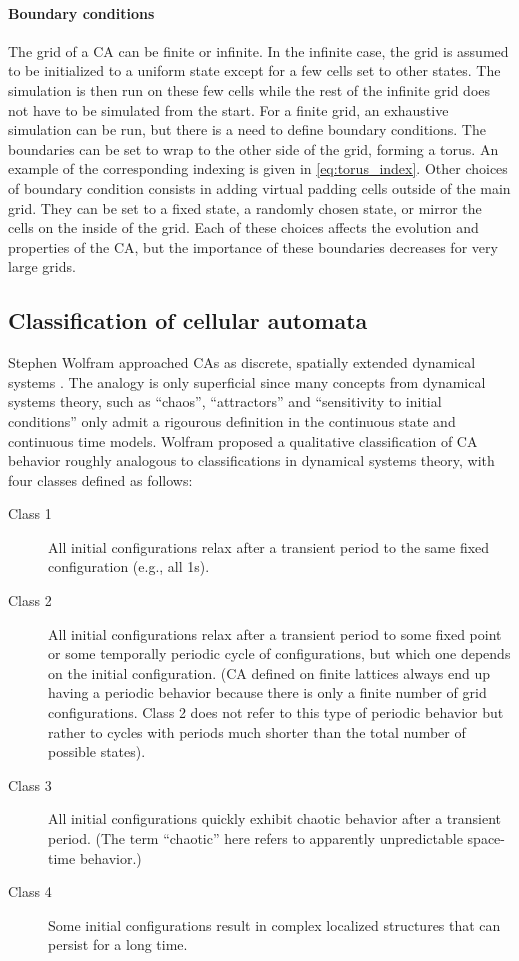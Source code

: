 \paragraph{Boundary conditions}
The grid of a \ac{CA} can be finite or infinite. In the infinite case, the grid
is assumed to be initialized to a uniform state except for a few cells set to
other states. The simulation is then run on these few cells while the rest of
the infinite grid does not have to be simulated from the start. For a finite
grid, an exhaustive simulation can be run, but there is a need to define
boundary conditions. The boundaries can be set to wrap to the other side of the
grid, forming a torus. An example of the corresponding indexing is given in
\eqref{eq:torus_index}. Other choices of boundary condition consists in adding
virtual padding cells outside of the main grid. They can be set to a fixed
state, a randomly chosen state, or mirror the cells on the inside of the grid.
Each of these choices affects the evolution and properties of the \ac{CA}, but
the importance of these boundaries decreases for very large grids.

\subsection{Classification of cellular automata\label{sec:class-cell-autom}}

Stephen Wolfram approached \acp{CA} as discrete, spatially extended dynamical
systems \parencite{wolframUniversalityComplexityCellular1984}. The analogy is
only superficial since many concepts from dynamical systems theory, such as
``chaos'', ``attractors'' and ``sensitivity to initial conditions'' only admit a
rigourous definition in the continuous state and continuous time models. Wolfram
proposed a qualitative classification of CA behavior roughly analogous to
classifications in dynamical systems theory, with four classes defined as
follows:

\begin{description}
  \item[Class 1] All initial configurations relax after a transient
        period to the same fixed configuration (e.g., all 1s).
  \item[Class 2] All initial configurations relax after a transient period to some
        fixed point or some temporally periodic cycle of configurations, but
        which one depends on the initial configuration. (\ac{CA} defined on
        finite lattices always end up having a periodic behavior because there
        is only a finite number of grid configurations. Class 2 does not refer to
        this type of periodic behavior but rather to cycles with periods much
        shorter than the total number of possible states).
  \item[Class 3] All initial configurations quickly exhibit chaotic behavior
        after a transient period. (The term “chaotic” here refers to
        apparently unpredictable space-time behavior.)
  \item[Class 4] Some initial configurations result in complex localized
        structures that can persist for a long time.
\end{description}

